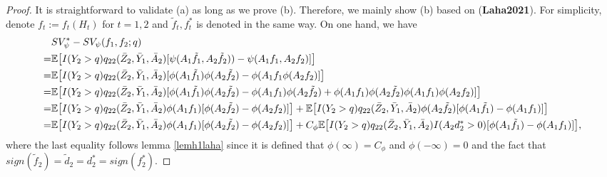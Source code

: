 \documentclass[10pt]{article}
\theoremstyle{remark} \newtheorem{rem}{Remark}
\begin{document}
\begin{proof}
    It is straightforward to validate (a) as long as we prove (b).
    Therefore, we mainly show (b) based on (\textbf{Laha2021}). 
    For simplicity, denote $f_t:=f_t(H_t)$ for $t=1,2$ and $\tilde f_t, f_t^*$ is denoted in the same way.
    On one hand, we have 
    \begin{align}
        &SV_\psi^* - SV_\psi(f_1,f_2;q) \notag\\
        =& \mathbb{E} \big[I(Y_2>q)q_{22}(\bar Z_{2}, \bar Y_{1}, \bar A_{2}) [\psi(A_1\tilde f_1, A_2\tilde f_2)) - \psi(A_1f_1, A_2f_2)]\big] \notag\\
        =& \mathbb{E} \big[I(Y_2>q)q_{22}(\bar Z_{2}, \bar Y_{1}, \bar A_{2}) [\phi(A_1\tilde f_1)\phi(A_2\tilde f_2) - \phi(A_1f_1\phi(A_2f_2)]\big] \notag\\
        =& \mathbb{E} \big[I(Y_2>q)q_{22}(\bar Z_{2}, \bar Y_{1}, \bar A_{2}) [\phi(A_1\tilde f_1)\phi(A_2\tilde f_2) - \phi(A_1 f_1)\phi(A_2\tilde f_2) + \phi(A_1 f_1)\phi(A_2\tilde f_2) \phi(A_1 f_1)\phi(A_2f_2)]\big] \notag \\
        =& \mathbb{E} \big[I(Y_2>q)q_{22}(\bar Z_{2}, \bar Y_{1}, \bar A_{2})\phi(A_1f_1)[\phi(A_2\tilde f_2)-\phi(A_2f_2)]\big] +
        \mathbb{E} \big[I(Y_2>q)q_{22}(\bar Z_{2}, \bar Y_{1}, \bar A_{2})\phi(A_2\tilde f_2)[\phi(A_1\tilde f_1)-\phi(A_1f_1)]\big] \notag\\
        =& \mathbb{E} \big[I(Y_2>q)q_{22}(\bar Z_{2}, \bar Y_{1}, \bar A_{2})\phi(A_1f_1)[\phi(A_2\tilde f_2)-\phi(A_2f_2)]\big] +
        C_\phi\mathbb{E} \big[I(Y_2>q)q_{22}(\bar Z_{2}, \bar Y_{1}, \bar A_{2})I(A_2d_2^*>0)[\phi(A_1\tilde f_1)-\phi(A_1f_1)]\big], \label{fcpf1}
    \end{align}
    where the last equality follows lemma \eqref{lemh1laha} since it is defined that $\phi(\infty)=C_\phi$ and $\phi(-\infty)=0$ and the fact that $sign(\tilde f_2)=\tilde d_2= d_2^*=sign(f_2^*)$. 
    

\end{proof}
\end{document}
